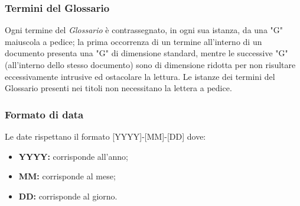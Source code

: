 \subsubsection{Termini del Glossario}\label{ProcessiDiSupportoDocumentazioneNormeTipograficheTerminiDelGlossario}
Ogni termine del \textit{Glossario} è contrassegnato, in ogni sua istanza, da una "G" maiuscola a pedice; la prima occorrenza di un termine all'interno di un documento presenta una "G" di dimensione standard, mentre le successive "G" (all'interno dello stesso documento) sono di dimensione ridotta per non risultare eccessivamente intrusive ed ostacolare la lettura.
Le istanze dei termini del Glossario presenti nei titoli non necessitano la lettera a pedice.
\subsubsection{Formato di data}\label{ProcessiDiSupportoDocumentazioneNormeTipograficheFormatoDiData}
Le date rispettano il formato
[YYYY]-[MM]-[DD] dove:
\begin{itemize}
	\item \textbf{YYYY:} corrisponde all'anno;
	\item \textbf{MM:} corrisponde al mese;
	\item \textbf{DD:} corrisponde al giorno.
\end{itemize}

